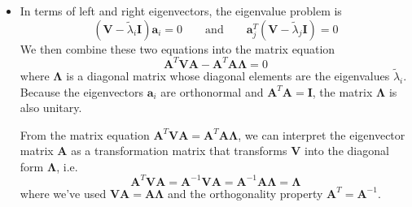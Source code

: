 \documentclass[11pt, a4paper]{article}
\newcommand{\eqtext}[1]{\qquad \text{#1} \qquad}
\newcommand{\mat}[1]{\mathbf{#1}}
\begin{document}
\begin{itemize}
	\item In terms of left and right eigenvectors, the eigenvalue problem is 
	\begin{equation*}
		(\mat{V} - \tilde{\lambda}_{i}\mat{I}) \bm{a}_{i} = 0 \eqtext{and} \bm{a}_{j}^{T}(\mat{V} - \tilde{\lambda}_{j}\mat{I}) = 0
	\end{equation*}
	We then combine these two equations into the matrix equation
	\begin{equation*}
		\mat{A}^{T} \mat{V} \mat{A} - \mat{A}^{T} \mat{A} \mat{\Lambda} = 0
	\end{equation*}
	where $ \mat{\Lambda} $ is a diagonal matrix whose diagonal elements are the eigenvalues $ \tilde{\lambda}_{i} $. Because the eigenvectors $ \bm{a}_{i} $ are orthonormal and $ \mat{A}^{T} \mat{A} = \mat{I} $, the matrix $ \mat{\Lambda} $ is also unitary.

	From the matrix equation $ \mat{A}^{T} \mat{V} \mat{A} = \mat{A}^{T} \mat{A} \mat{\Lambda}  $, we can interpret the eigenvector matrix $ \mat{A} $ as a transformation matrix that transforms $ \mat{V} $ into the diagonal form $ \mat{\Lambda} $, i.e.
	\begin{equation*}
		\mat{A}^{T} \mat{V} \mat{A} = \mat{A}^{-1} \mat{V} \mat{A} = \mat{A}^{-1} \mat{A} \mat{\Lambda}  = \mat{\Lambda}
	\end{equation*}
	where we've used $ \mat{V} \mat{A} = \mat{A} \mat{\Lambda}  $ and the orthogonality property $ \mat{A}^{T} = \mat{A}^{-1} $.
	
\end{itemize}
\end{document}
